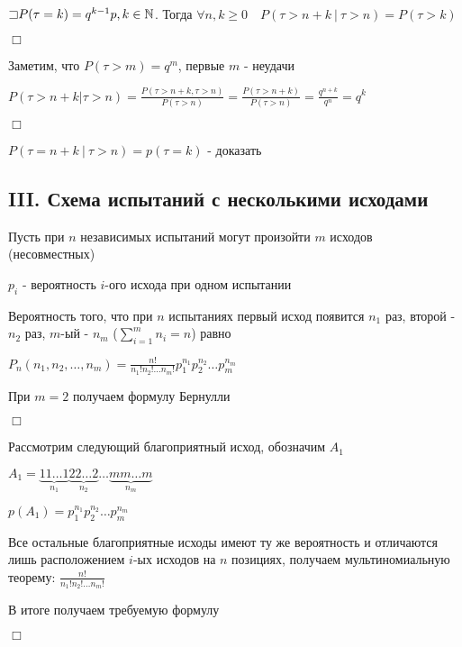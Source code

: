 \documentclass[12pt]{article}
\begin{document}
    \begin{MyTheorem}
        \Ths $\mathord{\sqsupset} P(\tau = k) = q^{k - 1} p, k \in \mathbb{N}$. Тогда $\forall n, k \geq 0 \quad P(\tau > n + k \ | \ \tau > n) = P(\tau > k)$
    \end{MyTheorem}

    \begin{MyProof}
        $\Box$

        Заметим, что $P(\tau > m) = q^m$, первые $m$ - неудачи

        $P(\tau > n + k | \tau > n) = \frac{P(\tau > n + k, \tau > n)}{P(\tau > n)} = \frac{P(\tau > n + k)}{P(\tau > n)} = \frac{q^{n + k}}{q^n} = q^k$

        $\Box$
    \end{MyProof}

    \Nota $P(\tau = n + k \ | \ \tau > n) = p(\tau = k)$ - \Lab доказать

    \subsection{III. Схема испытаний с несколькими исходами}

    Пусть при $n$ независимых испытаний могут произойти $m$ исходов (несовместных)

    $p_i$ - вероятность $i$-ого исхода при одном испытании

    \begin{MyTheorem}
        \Ths Вероятность того, что при $n$ испытаниях первый исход появится $n_1$ раз, второй - $n_2$ раз, $m$-ый - $n_m$ ($\sum_{i = 1}^m n_i = n$)
        равно

        $P_n(n_1, n_2, \dots, n_m) = \frac{n!}{n_1! n_2! \dots n_m!} p_1^{n_1} p_2^{n_2} \dots p_m^{n_m}$
    \end{MyTheorem}

    При $m = 2$ получаем формулу Бернулли

    \begin{MyProof}
        $\Box$

        Рассмотрим следующий благоприятный исход, обозначим $A_1$

        $A_1 = \underset{n_1}{\underbrace{11\dots1}}\underset{n_2}{\underbrace{22\dots2}}\dots\underset{n_m}{\underbrace{mm\dots m}}$

        $p(A_1) = p_1^{n_1} p_2^{n_2} \dots p_m^{n_m}$

        Все остальные благоприятные исходы имеют ту же вероятность и отличаются лишь расположением $i$-ых исходов на $n$ позициях,
        получаем мультиномиальную теорему: $\frac{n!}{n_1! n_2! \dots n_m!}$

        В итоге получаем требуемую формулу

        $\Box$
    \end{MyProof}
\end{document}
